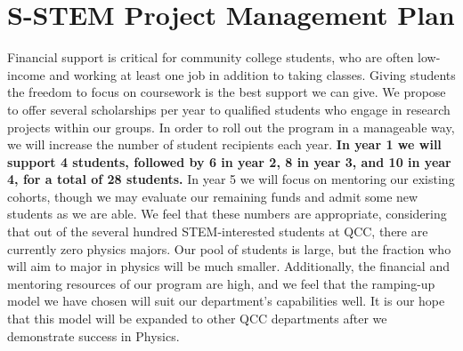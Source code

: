 \documentclass[12pt]{article}
\begin{document}
\section{S-STEM Project Management Plan}\label{sect:money}




Financial support is critical for community college students, who are often low-income and working at least one job in addition to taking classes.  Giving students the freedom to focus on coursework is the best support we can give.  We propose to offer several scholarships per year to qualified students who engage in research projects within our groups.  In order to roll out the program in a manageable way, we will increase the number of student recipients each year.  {\bf In year 1 we will support 4 students, followed by 6 in year 2, 8 in year 3, and 10 in year 4, for a total of 28 students.}  In year 5 we will focus on mentoring our existing cohorts, though we may evaluate our remaining funds and admit some new students as we are able.  We feel that these numbers are appropriate, considering that out of the several hundred STEM-interested students at QCC, there are currently zero physics majors.  Our pool of students is large, but the fraction who will aim to major in physics will be much smaller.  Additionally, the financial and mentoring resources of our program are high, and we feel that the ramping-up model we have chosen will suit our department's capabilities well.  It is our hope that this model will be expanded to other QCC departments after we demonstrate success in Physics.
\end{document}
